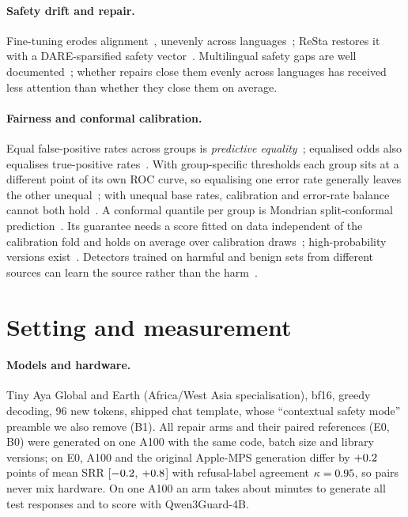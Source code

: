 \documentclass{article}
\newcommand{\ci}[2]{{\small[$#1$, $#2$]}}
\begin{document}
\paragraph{Safety drift and repair.} Fine-tuning erodes alignment~\citep{qi2024finetuning}, unevenly across languages~\citep{poppi2025fragility,hawkins2026heterogeneous}; ReSta restores it with a DARE-sparsified safety vector~\citep{bhardwaj2024resta}. Multilingual safety gaps are well documented~\citep{wang2023xsafety}; whether repairs close them evenly across languages has received less attention than whether they close them on average.
\paragraph{Fairness and conformal calibration.} Equal false-positive rates across groups is \emph{predictive equality}~\citep{corbettdavies2017cost}; equalised odds also equalises true-positive rates~\citep{hardt2016equality}. With group-specific thresholds each group sits at a different point of its own ROC curve, so equalising one error rate generally leaves the other unequal~\citep{hardt2016equality}; with unequal base rates, calibration and error-rate balance cannot both hold~\citep{chouldechova2017fair,kleinberg2017tradeoffs}. A conformal quantile per group is Mondrian split-conformal prediction~\citep{vovk2003mondrian,gibbs2025conditional}. Its guarantee needs a score fitted on data independent of the calibration fold and holds on average over calibration draws~\citep{angelopoulos2021gentle}; high-probability versions exist~\citep{angelopoulos2021ltt}. Detectors trained on harmful and benign sets from different sources can learn the source rather than the harm~\citep{fomin2026benchmarks,wang2025falsesense}.

\section{Setting and measurement}
\label{sec:setting}
\paragraph{Models and hardware.} Tiny Aya Global and Earth (Africa/West Asia specialisation), bf16, greedy decoding, 96 new tokens, shipped chat template, whose ``contextual safety mode'' preamble we also remove (B1). All repair arms and their paired references (E0, B0) were generated on one A100 with the same code, batch size and library versions; on E0, A100 and the original Apple-MPS generation differ by $+0.2$ points of mean SRR \ci{\HwSrrLo}{\HwSrrHi} with refusal-label agreement $\kappa=0.95$, so pairs never mix hardware. On one A100 an arm takes about \ComputeGenMin{} minutes to generate all test responses and \ComputeScoreMin{} to score with Qwen3Guard-4B.
\end{document}
